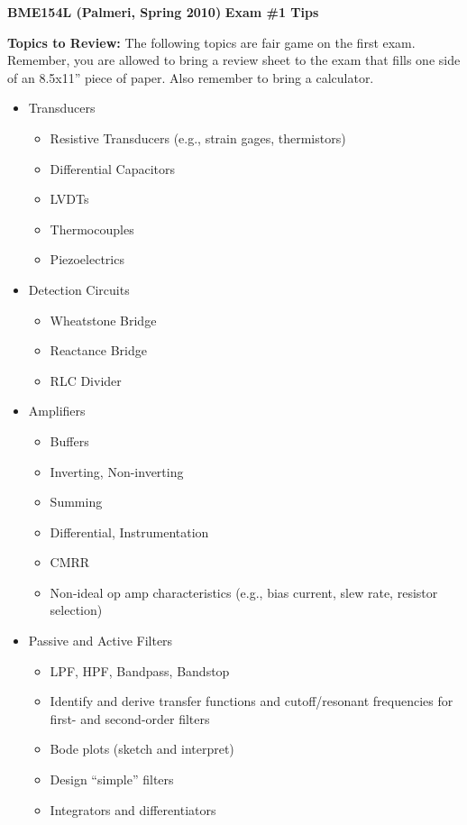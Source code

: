 \documentclass[11pt]{article}
\begin{document}
{\bf BME154L (Palmeri, Spring 2010)} \hfill
{\bf Exam \#1 Tips}

{\bf Topics to Review:} The following topics are fair game on the first exam.
Remember, you are allowed to bring a review sheet to the exam that fills one
side of an 8.5x11'' piece of paper.  Also remember to bring a calculator.

\begin{itemize}

\item Transducers
\begin{itemize}
    \item Resistive Transducers (e.g., strain gages, thermistors)
    \item Differential Capacitors
    \item LVDTs
    \item Thermocouples
    \item Piezoelectrics
\end{itemize}

\item Detection Circuits
\begin{itemize}
    \item Wheatstone Bridge
    \item Reactance Bridge
    \item RLC Divider
\end{itemize}

\item Amplifiers
\begin{itemize}
    \item Buffers
    \item Inverting, Non-inverting
    \item Summing
    \item Differential, Instrumentation
    \item CMRR
    \item Non-ideal op amp characteristics (e.g., bias current, slew rate, resistor selection)
\end{itemize}

\item Passive and Active Filters
\begin{itemize}
    \item LPF, HPF, Bandpass, Bandstop
    \item Identify and derive transfer functions and cutoff/resonant frequencies for first- and second-order filters
    \item Bode plots (sketch and interpret)
    \item Design ``simple'' filters
    \item Integrators and differentiators
\end{itemize}


\end{itemize}
\end{document}
